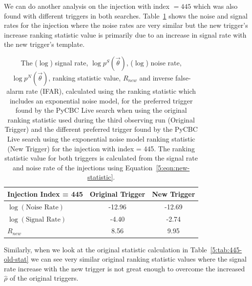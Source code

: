 We can do another analysis on the injection with index $= 445$ which was also found with different triggers in both searches. Table~\ref{5:tab:445-new-stat} shows the noise and signal rates for the injection where the noise rates are very similar but the new trigger's increase ranking statistic value is primarily due to an increase in signal rate with the new trigger's template.
%
\begin{table}[ht]
    \centering
    \begin{tabular}{lcc}
        \toprule
        \textbf{Injection Index = 445} & \textbf{Original Trigger} & \textbf{New Trigger} \\
        \midrule
        $\log\left(\text{Noise Rate}\right)$  & -12.96 & -12.69 \\
        $\log\left(\text{Signal Rate}\right)$ & -4.40 & -2.74 \\
        $R_{new}$ & 8.56 & 9.95 \\
        \bottomrule
    \end{tabular}
    \caption{The ($\log$) signal rate, $\log p^{S}(\Vec{\theta})$, ($\log$) noise rate, $\log p^{N}(\Vec{\theta})$, ranking statistic value, $R_{new}$ and inverse false-alarm rate (IFAR), calculated using the ranking statistic which includes an exponential noise model, for the preferred trigger found by the PyCBC Live search when using the original ranking statistic used during the third observing run (Original Trigger) and the different preferred trigger found by the PyCBC Live search using the exponential noise model ranking statistic (New Trigger) for the injection with index = 445. The ranking statistic value for both triggers is calculated from the signal rate and noise rate of the injections using Equation~\ref{5:eqn:new-statistic}.}
    \label{5:tab:445-new-stat}
\end{table}
%
Similarly, when we look at the original statistic calculation in Table~\ref{5:tab:445-old-stat} we can see very similar original ranking statistic values where the signal rate increase with the new trigger is not great enough to overcome the increased $\hat{\rho}$ of the original triggers.
%
